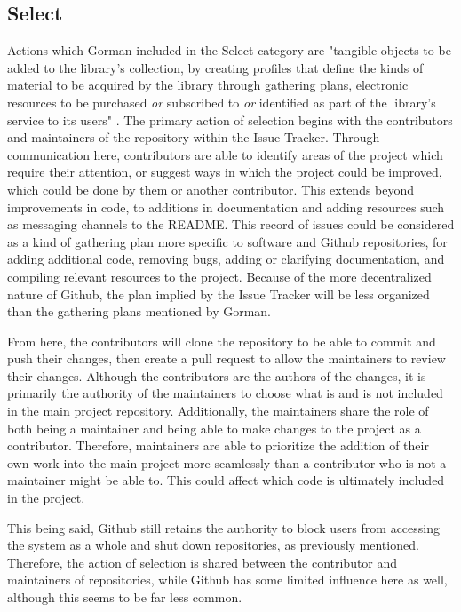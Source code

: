 \subsection{Select}
Actions which Gorman included in the Select category are "tangible objects to be added to the library's collection, by creating profiles that define the kinds of material to be acquired by the library through gathering plans, electronic resources to be purchased \textit{or} subscribed to \textit{or} identified as part of the library's service to its users" \cite{gorman2000values}.  The primary action of selection begins with the contributors and maintainers of the repository within the Issue Tracker. Through communication here, contributors are able to identify areas of the project which require their attention, or suggest ways in which the project could be improved, which could be done by them or another contributor. This extends beyond improvements in code, to additions in documentation and adding resources such as messaging channels to the README. This record of issues could be considered as a kind of gathering plan more specific to software and Github repositories, for adding additional code, removing bugs, adding or clarifying documentation, and compiling relevant resources to the project. Because of the more decentralized nature of Github, the plan implied by the Issue Tracker will be less organized than the gathering plans mentioned by Gorman. 

From here, the contributors will clone the repository to be able to commit and push their changes, then create a pull request to allow the maintainers to review their changes. Although the contributors are the authors of the changes, it is primarily the authority of the maintainers to choose what is and is not included in the main project repository. Additionally, the maintainers share the role of both being a maintainer and being able to make changes to the project as a contributor. Therefore, maintainers are able to prioritize the addition of their own work into the main project more seamlessly than a contributor who is not a maintainer might be able to. This could affect which code is ultimately included in the project. 

This being said, Github still retains the authority to block users from accessing the system as a whole and shut down repositories, as previously mentioned. Therefore, the action of selection is shared between the contributor and maintainers of repositories, while Github has some limited influence here as well, although this seems to be far less common. 

